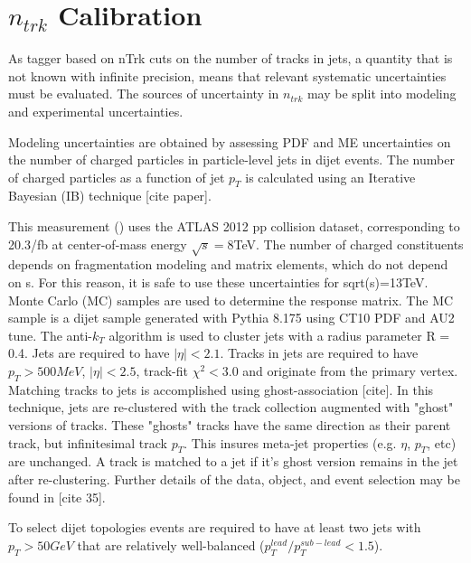 \pagebreak
\pagebreak
\pagebreak
\chapter{$n_{trk}$ Calibration}
As tagger based on nTrk cuts on the number of tracks in jets, a quantity that is not known with infinite precision, means that relevant systematic uncertainties must be evaluated. The sources of uncertainty in $n_{trk}$ may be split into modeling and experimental uncertainties. 

Modeling uncertainties are obtained by assessing PDF and ME uncertainties on the number of charged particles in particle-level jets in dijet events. The number of charged particles as a function of jet $p_{T}$  is calculated using an Iterative Bayesian (IB) technique [cite paper].

This measurement (\cite{Unfolding}) uses the ATLAS 2012 pp collision dataset, corresponding to 20.3/fb at center-of-mass energy $\sqrt{s}=8$TeV. The number of charged constituents depends on fragmentation modeling and matrix elements, which do not depend on s. For this reason, it is safe to use these uncertainties for sqrt(s)=13TeV. Monte Carlo (MC) samples are used to determine the response matrix. The MC sample is a dijet sample generated with Pythia 8.175 using CT10 PDF and AU2 tune.  The anti-$k_{T}$ algorithm is used to cluster jets with a radius parameter R = 0.4. Jets are required to have $|\eta| < 2.1$. Tracks in jets are required to have $p_{T}>500MeV$, $|\eta|<2.5$, track-fit $\chi^{2} < 3.0$ and originate from the primary vertex. Matching tracks to jets is accomplished using ghost-association [cite]. In this technique, jets are re-clustered with the track collection augmented with "ghost" versions of tracks.  These "ghosts" tracks have the same direction as their parent track, but infinitesimal track $p_{T}$. This insures meta-jet properties (e.g. $\eta$, $p_{T}$, etc) are unchanged. A track is matched to a jet if it's ghost version remains in the jet after re-clustering. Further details of the data, object, and event selection may be found in [cite 35].

To select dijet topologies events are required to have at least two jets with $p_{T} > 50GeV$ that are relatively well-balanced ($p_{T}^{lead}/p_{T}^{sub-lead} < 1.5$). 

